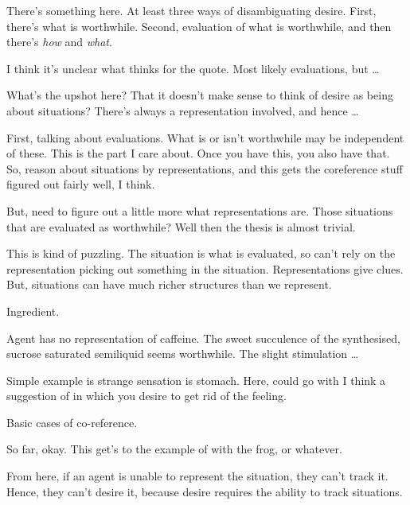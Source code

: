 \documentclass[10pt]{article}
\begin{document}
There's something here.
At least three ways of disambiguating desire.
First, there's what is worthwhile.
Second, evaluation of what is worthwhile, and then there's \emph{how} and \emph{what}.

I think it's unclear what \citeauthor{Schroeder:2004aa} thinks for the quote.
Most likely evaluations, but \dots


What's the upshot here?
That it doesn't make sense to think of desire as being about situations?
There's always a representation involved, and hence \dots








First, talking about evaluations.
What is or isn't worthwhile may be independent of these.
This is the part I care about.
Once you have this, you also have that.
So, reason about situations by representations, and this gets the coreference stuff figured out fairly well, I think.







But, need to figure out a little more what representations are.
Those situations that are evaluated as worthwhile?
Well then the thesis is almost trivial.



This is kind of puzzling.
The situation is what is evaluated, so can't rely on the representation picking out something in the situation.
Representations give clues.
But, situations can have much richer structures than we represent.

Ingredient.

Agent has no representation of caffeine.
The sweet succulence of the synthesised, sucrose saturated semiliquid seems worthwhile.
The slight stimulation \dots

Simple example is strange sensation is stomach.
Here, could go with I think a suggestion of \citeauthor{Pettit:1991aa} in which you desire to get rid of the feeling.







Basic cases of co-reference.






So far, okay.
This get's to the example of \citeauthor{Schroeder:2004aa} with the frog, or whatever.

From here, if an agent is unable to represent the situation, they can't track it.
Hence, they can't desire it, because desire requires the ability to track situations.
\end{document}
